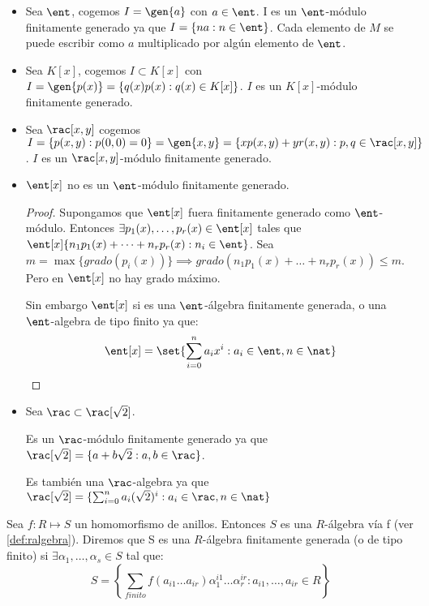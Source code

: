 \begin{example}
	\begin{itemize}
	\item Sea $\ent$, cogemos $I=\gen{a}$ con $a\in \ent$. I es un $\ent$-módulo finitamente generado ya que $I=\{na:n \in \ent \}$. Cada elemento de $M$ se puede escribir como $a$ multiplicado por algún elemento de $\ent$.
	\item Sea $K[x]$, cogemos $I \subset K[x]$ con $I=\gen{p(x)}=\{ q(x)p(x): q(x) \in K[x] \}$. $I$ es un $K[x]$-módulo finitamente generado.
	\item Sea $\rac[x,y]$ cogemos $I=\{ p(x,y):p(0,0)=0 \}=\gen{x,y}=\{ xp(x,y)+yr(x,y): p,q \in \rac[x,y] \}$. $I$ es un $\rac[x,y]$-módulo finitamente generado.
	\item $\ent[x]$ no es un $\ent$-módulo finitamente generado.

	\begin{proof}
		Supongamos que $\ent[x]$ fuera finitamente generado como $\ent$-módulo. Entonces $\exists p_1(x),\dots,p_r(x) \in \ent[x]$ tales que $\ent[x]\{ n_1p_1(x)+\dots+n_rp_r(x): n_i \in \ent \}$. Sea $m=\max\{grado(p_i(x)) \} \implies grado(n_1p_1(x)+\dots+n_rp_r(x)) \leq m$. Pero en $\ent[x]$ no hay grado máximo.

		Sin embargo $\ent[x]$ si es una $\ent$-álgebra finitamente generada, o una $\ent$-algebra de tipo finito ya que:
		$$ \ent[x]=\set{ \sum_{i=0}^n a_i x^i: a_i \in \ent, n \in \nat }$$
	\end{proof}
	\item Sea $\rac \subset \rac[\sqrt{2}]$.

	Es un $\rac$-módulo finitamente generado ya que $\rac[\sqrt{2}]=\{ a+b\sqrt{2}:a,b \in \rac \}$.

	Es también una $\rac$-algebra ya que $\rac[\sqrt{2}]=\{ \sum_{i=0}^n a_i(\sqrt{2})^i :a_i \in \rac, n \in \nat \}$
\end{itemize}
\end{example}

\begin{defn}\label{def:ralgebra_fg}
	Sea $f: R \longmapsto S$ un homomorfismo de anillos. Entonces $S$ es una $R$-álgebra vía f (ver \ref{def:ralgebra}). Diremos que S es una $R$-álgebra finitamente generada (o de tipo finito) si $\exists \alpha_1,\dots, \alpha_s \in S$ tal que:
	$$ S=\left\{ \sum_{finito} f(a_{i1}\dots a_{ir})\alpha_1^{i1}\dots\alpha_r^{ir}: a_{i1},\dots, a_{ir} \in R \right\} $$
\end{defn}

